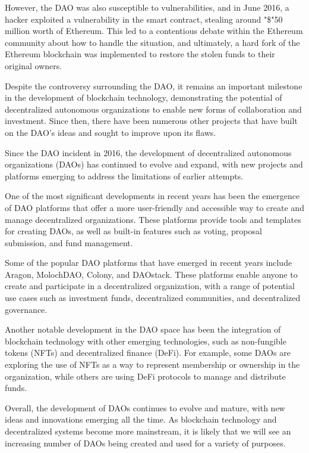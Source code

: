 \documentclass[lettersize,journal]{IEEEtran}
\begin{document}
However, the DAO was also susceptible to vulnerabilities, and in June 2016, a hacker exploited a vulnerability in the smart contract, stealing around "\$"50 million worth of Ethereum. This led to a contentious debate within the Ethereum community about how to handle the situation, and ultimately, a hard fork of the Ethereum blockchain was implemented to restore the stolen funds to their original owners.

Despite the controversy surrounding the DAO, it remains an important milestone in the development of blockchain technology, demonstrating the potential of decentralized autonomous organizations to enable new forms of collaboration and investment. Since then, there have been numerous other projects that have built on the DAO's ideas and sought to improve upon its flaws.

Since the DAO incident in 2016, the development of decentralized autonomous organizations (DAOs) has continued to evolve and expand, with new projects and platforms emerging to address the limitations of earlier attempts.

One of the most significant developments in recent years has been the emergence of DAO platforms that offer a more user-friendly and accessible way to create and manage decentralized organizations. These platforms provide tools and templates for creating DAOs, as well as built-in features such as voting, proposal submission, and fund management.

Some of the popular DAO platforms that have emerged in recent years include Aragon, MolochDAO, Colony, and DAOstack. These platforms enable anyone to create and participate in a decentralized organization, with a range of potential use cases such as investment funds, decentralized communities, and decentralized governance.


Another notable development in the DAO space has been the integration of blockchain technology with other emerging technologies, such as non-fungible tokens (NFTs) and decentralized finance (DeFi). For example, some DAOs are exploring the use of NFTs as a way to represent membership or ownership in the organization, while others are using DeFi protocols to manage and distribute funds.

Overall, the development of DAOs continues to evolve and mature, with new ideas and innovations emerging all the time. As blockchain technology and decentralized systems become more mainstream, it is likely that we will see an increasing number of DAOs being created and used for a variety of purposes.
\end{document}
